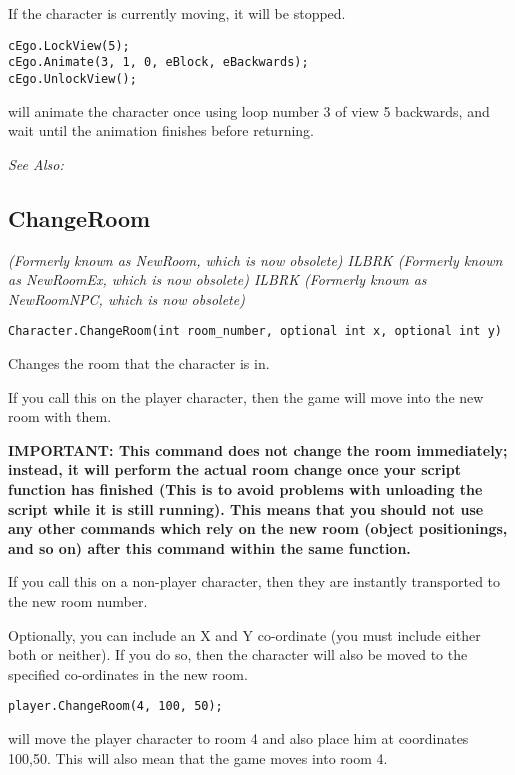 If the character is currently moving, it will be stopped.

\begin{verbatim}
cEgo.LockView(5);
cEgo.Animate(3, 1, 0, eBlock, eBackwards);
cEgo.UnlockView();
\end{verbatim}
will animate the character once using loop number 3 of view 5 backwards, and
wait until the animation finishes before returning.

\it{See Also:} 



\subsection{ChangeRoom}\label{Character.ChangeRoom}%

\it{(Formerly known as NewRoom, which is now obsolete)} ILBRK
\it{(Formerly known as NewRoomEx, which is now obsolete)} ILBRK
\it{(Formerly known as NewRoomNPC, which is now obsolete)}

\begin{verbatim}
Character.ChangeRoom(int room_number, optional int x, optional int y)
\end{verbatim}

Changes the room that the character is in.

If you call this on the player character, then the game will move into the new
room with them.

\bf{IMPORTANT:} This command does not change the room immediately; instead, it
will perform the actual room change once your script function has finished
(This is to avoid problems with unloading the script while it is still
running). This means that you should not use any other commands which rely
on the new room (object positionings, and so on) after this command within
the same function.

If you call this on a non-player character, then they are instantly transported
to the new room number.

Optionally, you can include an X and Y co-ordinate (you must include either both
or neither). If you do so, then the character will also be moved to the specified
co-ordinates in the new room.

\begin{verbatim}
player.ChangeRoom(4, 100, 50);
\end{verbatim}
will move the player character to room 4 and also place him at coordinates 100,50.
This will also mean that the game moves into room 4.

